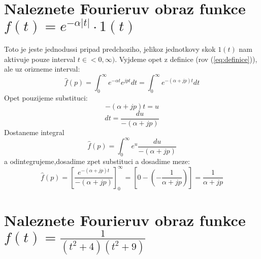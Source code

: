\newpage

\section{Naleznete Fourieruv obraz funkce $f(t)=e^{-\alpha|t|}\cdot 1(t)$}
Toto je jeste jednodussi pripad predchoziho, jelikoz jednotkovy skok $1(t)$ nam aktivuje pouze interval $t \in <0,\infty)$. Vyjdeme opet z definice (rov (\ref{eq:definice})), ale uz orizneme interval:
$$\hat{f}(p)=\int_0^\infty e^{-\alpha t}e^{jpt}dt=\int_0^\infty e^{-(\alpha+jp)t}dt$$
Opet pouzijeme substituci:
$$-(\alpha+jp)t=u$$
$$dt=\frac{du}{-(\alpha+jp)}$$
Dostaneme integral
$$\hat{f}(p)=\int_0^\infty e^u \frac{du}{-(\alpha+jp)}$$
a odintegrujeme,dosadime zpet substituci a dosadime meze:
$$\hat{f}(p)=\left[\frac{e^{-(\alpha+jp)t}}{-(\alpha+jp)}\right]_0^\infty=\left[0-\left(-\frac{1}{\alpha+jp}\right)\right]=\frac{1}{\alpha+jp}$$


\newpage

\section{\label{sec:3}Naleznete Fourieruv obraz funkce $f(t)=\frac{1}{(t^2+4)(t^2+9)}$}

